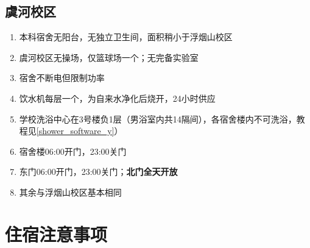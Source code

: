 \subsection[虞河校区]{虞河校区}
\begin{enumerate}
      \item 本科宿舍无阳台，无独立卫生间，面积稍小于浮烟山校区
      \item 虞河校区无操场，仅篮球场一个；无完备实验室
      \item 宿舍不断电但限制功率
      \item 饮水机每层一个，为自来水净化后烧开，24小时供应
      \item 学校洗浴中心在3号楼负1层（男浴室内共14隔间），各宿舍楼内不可洗浴，教程见\uline{\ref{shower_software_y}}）
      \item 宿舍楼06:00开门，23:00关门
      \item 东门06:00开门，23:00关门；\textbf{北门全天开放}
      \item 其余与浮烟山校区基本相同
\end{enumerate}


\section[住宿注意事项]{住宿注意事项}
